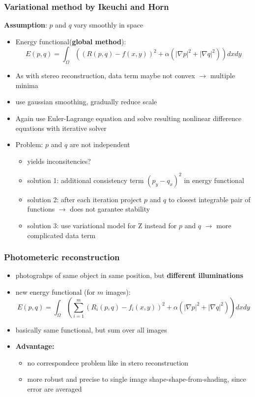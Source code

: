 \documentclass[11pt]{article}
\begin{document}
\subsubsection{Variational method by Ikeuchi and Horn}
\label{sec-6-3-3}
\textbf{Assumption}: $p$ and $q$ vary smoothly in space
\begin{itemize}
\item Energy functional(\textbf{global method}):
      \[ E(p,q) = \int_\Omega ((R(p,q)-f(x,y))^2 + \alpha (|\nabla p|^2 + |\nabla q|^2))dx dy \]
\item As with stereo reconstruction, data term maybe not convex $\rightarrow$ multiple minima
\item use gaussian smoothing, gradually reduce scale
\item Again use Euler-Lagrange equation and solve resulting nonlinear difference equations
with iterative solver
\item Problem: $p$ and $q$ are not independent
\begin{itemize}
\item yields inconsitencies?
\item solution 1: additional consistency term $(p_y -q_x)^2$ in energy functional
\item solution 2: after each iteration project $p$ and $q$ to closest integrable pair
of functions $\rightarrow$ does not garantee stability
\item solution 3: use variational model for Z instead for $p$ and $q$ $\rightarrow$
more complicated data term
\end{itemize}
\end{itemize}
\subsubsection{Photometeric reconstruction}
\label{sec-6-3-4}
\begin{itemize}
\item photograhps of same object in same position, but \textbf{different illuminations}
\item new energy functional (for $m$ images):
      \[ E(p,q) = \int_\Omega \left( \sum_{i=1}^m (R_i(p,q)-f_i(x,y))^2 +
         \alpha (|\nabla p|^2 + |\nabla q |^2) \right) dx dy \]
\item basically same functional, but sum over all images
\item \textbf{Advantage:}
\begin{itemize}
\item no correspondece problem like in stero reconstruction
\item more robust and precise to single image shape-shape-from-shading, since
error are averaged
\end{itemize}
\end{itemize}
\end{document}
